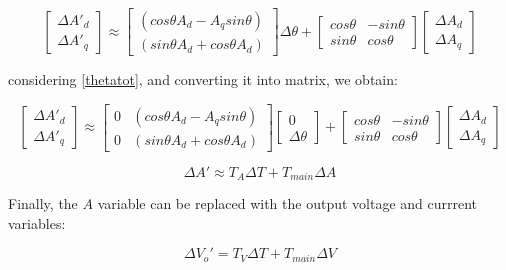 \begin{equation}\label{}
\begin{bmatrix}\Delta A'_d\\\Delta A'_q\end{bmatrix}\approx \begin{bmatrix} (cos\theta A_d - A_q sin\theta) \\ (sin\theta A_d+ cos\theta A_d) \end{bmatrix}\Delta \theta +  \begin{bmatrix}cos\theta & -sin\theta\\sin\theta & cos\theta\end{bmatrix}  \begin{bmatrix}\Delta A_d\\\Delta A_q\end{bmatrix}
\end{equation}

considering \ref{thetatot}, and converting it into matrix, we obtain:

\begin{equation}\label{}
\begin{bmatrix}\Delta A'_d\\\Delta A'_q\end{bmatrix}\approx \begin{bmatrix} 0 & (cos\theta A_d - A_q sin\theta) \\ 0 & (sin\theta A_d+ cos\theta A_d) \end{bmatrix}\begin{bmatrix}0 \\\Delta \theta \end{bmatrix}+  \begin{bmatrix}cos\theta & -sin\theta\\sin\theta & cos\theta\end{bmatrix}  \begin{bmatrix}\Delta A_d\\\Delta A_q\end{bmatrix}
\end{equation}

\begin{equation}\label{}
\Delta A'\approx T_A \Delta T+  T_{main} \Delta A
\end{equation}

Finally, the $A$ variable can be replaced with the output voltage and currrent variables:

\begin{equation}\label{}
\Delta V_o'= T_V \Delta T+  T_{main} \Delta V
\end{equation}

